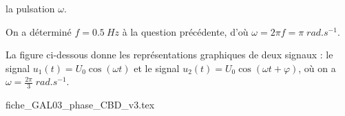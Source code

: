 

\begin{enonce}
la pulsation $\omega$.
\end{enonce}


\begin{corrige}
On a déterminé $f=\SI{0,5}{Hz}$ à la question précédente, d'où $\omega=2\pi f=\pi\;\si{rad.s^{-1}}$.
\end{corrige}



\finEntrainement






\hauteurLargeurCadreReponse		{8mm}{5cm}
\initialisationEntrainement

La figure ci-dessous donne les représentations graphiques de deux signaux : le signal $u_1(t)=U_0\cos(\omega t)$ et le signal $u_2(t)=U_0\cos(\omega t+\varphi)$, où on a $\omega=\frac{2\pi}{3}\; \si{rad.s^{-1}}$.

\def\ratioGraphiqueX{1.1}
\def\ratioGraphiqueY{0.7}

\begin{center}
{fiche_GAL03_phase_CBD_v3.tex}
\end{center}

\debutEntrainement


